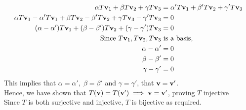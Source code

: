 \documentclass[10pt]{article}
\begin{document}
{{\begin{spacing}{1.5}
\begin{center}
\begin{align*}
                \alpha T{\bf v}_1 + \beta T{\bf v}_2 + \gamma T{\bf v}_3&=\alpha' T{\bf v}_1 + \beta' T{\bf v}_2 + \gamma' T{\bf v}_3\\
                \alpha T{\bf v}_1 - \alpha' T{\bf v}_1+ \beta T{\bf v}_2 - \beta' T{\bf v}_2+ \gamma T{\bf v}_3-\gamma' T{\bf v}_3&=0\\
                (\alpha-\alpha')T{\bf v}_1+(\beta-\beta') T{\bf v}_2+(\gamma-\gamma') T{\bf v}_3&=0\\
                \text{Since }T{\bf v}_1, T{\bf v}_2, T{\bf v}_3&\text{ is a basis,}\\
                \alpha-\alpha'&=0\\
                \beta-\beta'&=0\\
                \gamma-\gamma'&=0
            \end{align*}
            This implies that $\alpha=\alpha',\;\beta=\beta'$ and $\gamma=\gamma'$, that ${\bf v}={\bf v}'$.\\
            Hence, we have shown that $T({\bf v})=T({\bf v}')\implies{\bf v}={\bf v}'$, proving $T$ injective\\
            \vspace{10pt}
            Since $T$ is both surjective and injective, $T$ is bijective as required.
        \end{center}
    \end{spacing}

	} 
}
\end{document}
